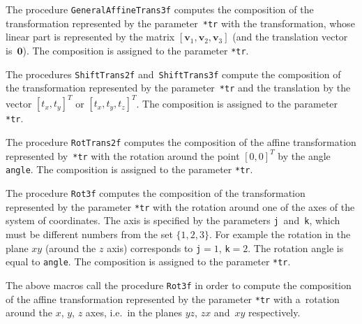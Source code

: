 \vspace{\bigskipamount}
The procedure \texttt{GeneralAffineTrans3f} computes the composition
of the transformation represented by the parameter~\texttt{*tr}
with the transformation, whose linear part is represented by the matrix
$[\bm{v}_1,\bm{v}_2,\bm{v}_3]$ (and the translation vector is~$\bm{0}$).
The composition is assigned to the parameter \texttt{*tr}.

\vspace{\bigskipamount}
The procedures \texttt{ShiftTrans2f} and~\texttt{ShiftTrans3f} compute
the composition of the transformation represented by the
parameter~\texttt{*tr} and the translation by the vector
$[t_x,t_y]^T$ or $[t_x,t_y,t_z]^T$.
The composition is assigned to the parameter \texttt{*tr}.
 
\vspace{\bigskipamount}
The procedure \texttt{RotTrans2f} computes the composition of the affine
transformation represented by~\texttt{*tr} with the rotation
around the point $[0,0]^T$ by the angle \texttt{angle}.
The composition is assigned to the parameter \texttt{*tr}.

\vspace{\bigskipamount}
The procedure \texttt{Rot3f} computes the composition of the transformation
represented by the parameter \texttt{*tr} with the rotation around one of
the axes of the system of coordinates. The axis is specified by the parameters
\texttt{j}~and~\texttt{k}, which must be different numbers from the set
$\{1,2,3\}$. For example the rotation in the plane $xy$ (around the $z$ axis)
corresponds to \texttt{j}${}=1$, \texttt{k}${}=2$. The rotation angle is equal to
\texttt{angle}.
The composition is assigned to the parameter \texttt{*tr}.

\newpage
The above macros call the procedure \texttt{Rot3f} in order to compute the
composition of the affine transformation represented by the parameter
\texttt{*tr} with a~rotation around the $x$, $y$, $z$ axes, i.e.\ in
the planes $yz$, $zx$ and~$xy$ respectively.

